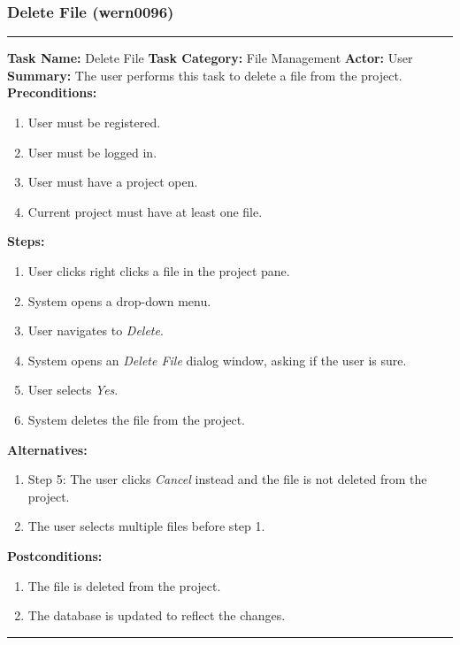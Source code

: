 \documentclass[11pt]{report}
\begin{document}
\subsubsection{Delete File (wern0096)}
\vspace{2pt}
\hrule
\vspace{8pt}
	\noindent\textbf{Task Name:} Delete File \newline
	\textbf{Task Category:} File Management \newline
	\textbf{Actor:} User \newline
	\textbf{Summary:} The user performs this task to delete a file from the project. \newline
	\textbf{Preconditions:}
	\begin{enumerate}
		\item User must be registered.
		\item User must be logged in.
		\item User must have a project open.
		\item Current project must have at least one file.
	\end{enumerate}
	\textbf{Steps:}
	\begin{enumerate}
		\item User clicks right clicks a file in the project pane.
		\item System opens a drop-down menu.
		\item User navigates to \textit{Delete}.
		\item System opens an \textit{Delete File} dialog window, asking if the user is sure.
		\item User selects \textit{Yes}.
		\item System deletes the file from the project.
	\end{enumerate}
	\textbf{Alternatives:}
	\begin{enumerate}
		\item Step 5: The user clicks \textit{Cancel} instead and the file is not deleted from the project.
		\item The user selects multiple files before step 1.
	\end{enumerate}
	\textbf{Postconditions:}
	\begin{enumerate}
		\item The file is deleted from the project.
		\item The database is updated to reflect the changes.
	\end{enumerate}
\vspace{8pt}
\hrule
\newpage
\end{document}

